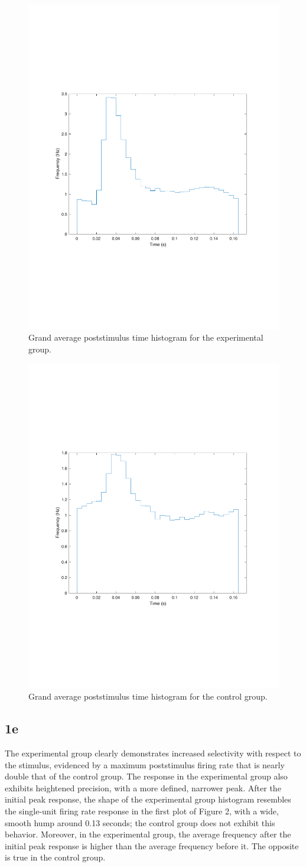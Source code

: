 \documentclass[]{article}
\begin{document}
\begin{figure}[H]
    \centering
    \includegraphics[width=0.5\linewidth]{problem1dExp.pdf}
    \caption{Grand average poststimulus time histogram for the experimental group.}
    \label{fig:my_label}
\end{figure}

\begin{figure}[H]
    \centering
    \includegraphics[width=0.5\linewidth]{problem1dControl.pdf}
    \caption{Grand average poststimulus time histogram for the control group.}
    \label{fig:my_label}
\end{figure}

\subsection*{1e}

The experimental group clearly demonstrates increased selectivity with respect to the stimulus, evidenced by a maximum poststimulus firing rate that is nearly double that of the control group. The response in the experimental group also exhibits heightened precision, with a more defined, narrower peak. After the initial peak response, the shape of the experimental group histogram resembles the single-unit firing rate response in the first plot of Figure 2, with a wide, smooth hump around 0.13 seconds; the control group does not exhibit this behavior. Moreover, in the experimental group, the average frequency after the initial peak response is higher than the average frequency before it. The opposite is true in the control group.
\end{document}
